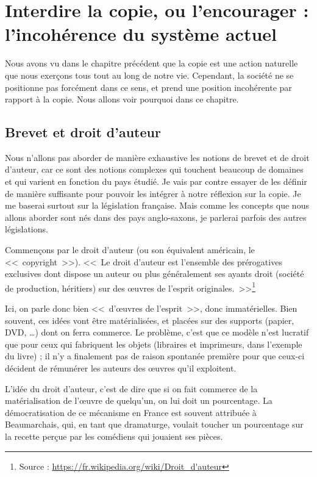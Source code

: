 \chapter{Interdire la copie, ou l'encourager : l'incohérence du système actuel}

Nous avons vu dans le chapitre précédent que la copie est une action naturelle que nous exerçons tous tout au long de notre vie.
Cependant, la société ne se positionne pas forcément dans ce sens, et prend une position incohérente par rapport à la copie.
Nous allons voir pourquoi dans ce chapitre.

\section{Brevet et droit d'auteur}

Nous n'allons pas aborder de manière exhaustive les notions de brevet et de droit d'auteur, car ce sont des notions complexes qui touchent beaucoup de domaines et qui varient en fonction du pays étudié.
Je vais par contre essayer de les définir de manière suffisante pour pouvoir les intégrer à notre réflexion sur la copie.
Je me baserai surtout sur la législation française.
Mais comme les concepts que nous allons aborder sont nés dans des pays anglo-saxons, je parlerai parfois des autres législations.

Commençons par le droit d'auteur (ou son équivalent américain, le <<~copyright~>>).
<<~Le droit d'auteur est l'ensemble des prérogatives exclusives dont dispose un auteur ou plus généralement ses ayants droit (société de production, héritiers) sur des œuvres de l'esprit originales.~>>\footnote{Source : \url{https://fr.wikipedia.org/wiki/Droit_d'auteur}}

Ici, on parle donc bien <<~d'œuvres de l'esprit~>>, donc immatérielles.
Bien souvent, ces idées vont être matérialisées, et placées sur des supports (papier, DVD, \dots{}) dont on ferra commerce.
Le problème, c'est que ce modèle n'est lucratif que pour ceux qui fabriquent les objets (libraires et imprimeurs, dans l'exemple du livre) ; il n'y a finalement pas de raison spontanée première pour que ceux-ci décident de rémunérer les auteurs des œuvres qu'il exploitent.

\label{droit-auteur}
L'idée du droit d'auteur, c'est de dire que si on fait commerce de la matérialisation de l'œuvre de quelqu'un, on lui doit un pourcentage.
La démocratisation de ce mécanisme en France est souvent attribuée à Beaumarchais, qui, en tant que dramaturge, voulait toucher un pourcentage sur la recette perçue par les comédiens qui jouaient ses pièces.

